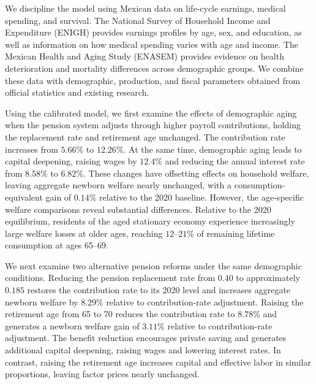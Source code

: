 \documentclass[12pt,a4paper]{article}
\begin{document}
We discipline the model using Mexican data on life-cycle earnings, medical spending, and survival. The National Survey of Household Income and Expenditure (ENIGH) provides earnings profiles by age, sex, and education, as well as information on how medical spending varies with age and income. The Mexican Health and Aging Study (ENASEM) provides evidence on health deterioration and mortality differences across demographic groups. We combine these data with demographic, production, and fiscal parameters obtained from official statistics and existing research.


Using the calibrated model, we first examine the effects of demographic aging when the pension system adjusts through higher payroll contributions, holding the replacement rate and retirement age unchanged. The contribution rate increases from $5.66\%$ to $12.26\%$. At the same time, demographic aging leads to capital deepening, raising wages by $12.4\%$ and reducing the annual interest rate from $8.58\%$ to $6.82\%$. These changes have offsetting effects on household welfare, leaving aggregate newborn welfare nearly unchanged, with a consumption-equivalent gain of $0.14\%$ relative to the 2020 baseline. However, the age-specific welfare comparisons reveal substantial differences. Relative to the 2020 equilibrium, residents of the aged stationary economy experience increasingly large welfare losses at older ages, reaching $12$--$21\%$ of remaining lifetime consumption at ages 65--69.

We next examine two alternative pension reforms under the same demographic conditions. Reducing the pension replacement rate from $0.40$ to approximately $0.185$ restores the contribution rate to its 2020 level and increases aggregate newborn welfare by $8.29\%$ relative to contribution-rate adjustment. Raising the retirement age from 65 to 70 reduces the contribution rate to $8.78\%$ and generates a newborn welfare gain of $3.11\%$ relative to contribution-rate adjustment. The benefit reduction encourages private saving and generates additional capital deepening, raising wages and lowering interest rates. In contrast, raising the retirement age increases capital and effective labor in similar proportions, leaving factor prices nearly unchanged.
\end{document}
